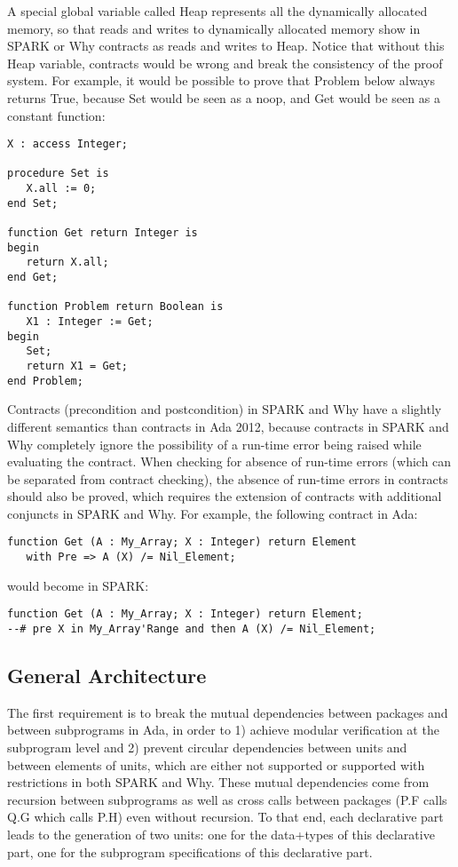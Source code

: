 \documentclass{article}
\begin{document}
A special global variable called Heap represents all the dynamically allocated
memory, so that reads and writes to dynamically allocated memory show in SPARK
or Why contracts as reads and writes to Heap. Notice that without this Heap
variable, contracts would be wrong and break the consistency of the proof
system. For example, it would be possible to prove that Problem below always
returns True, because Set would be seen as a noop, and Get would be seen as a
constant function:

\begin{verbatim}
X : access Integer;

procedure Set is
   X.all := 0;
end Set;

function Get return Integer is
begin
   return X.all;
end Get;

function Problem return Boolean is
   X1 : Integer := Get;
begin
   Set;
   return X1 = Get;
end Problem;
\end{verbatim}

Contracts (precondition and postcondition) in SPARK and Why have a
slightly different semantics than contracts in Ada 2012, because contracts in
SPARK and Why completely ignore the possibility of a run-time error being
raised while evaluating the contract. When checking for absence of run-time
errors (which can be separated from contract checking), the absence of run-time
errors in contracts should also be proved, which requires the extension of
contracts with additional conjuncts in SPARK and Why. For example, the
following contract in Ada:

\begin{verbatim}
function Get (A : My_Array; X : Integer) return Element
   with Pre => A (X) /= Nil_Element;
\end{verbatim}

would become in SPARK:

\begin{verbatim}
function Get (A : My_Array; X : Integer) return Element;
--# pre X in My_Array'Range and then A (X) /= Nil_Element;
\end{verbatim}

\subsection{General Architecture}

The first requirement is to break the mutual dependencies between packages and
between subprograms in Ada, in order to 1) achieve modular verification at the
subprogram level and 2) prevent circular dependencies between units and between
elements of units, which are either not supported or supported with
restrictions in both SPARK and Why. These mutual dependencies come from
recursion between subprograms as well as cross calls between packages (P.F
calls Q.G which calls P.H) even without recursion. To that end, each
declarative part leads to the generation of two units: one for the data+types
of this declarative part, one for the subprogram specifications of this
declarative part.
\end{document}
